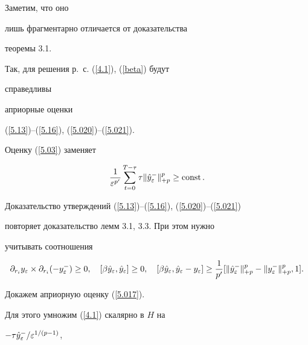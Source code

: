 \begin{pf}


Заметим, что оно 


лишь фрагментарно отличается от доказательства


теоремы 3.1.


Так, для решения р.~с. (\ref{4.1}), (\ref{beta}) будут


справедливы


априорные оценки


(\ref{5.13})--(\ref{5.16}), (\ref{5.020})--(\ref{5.021}).


Оценку (\ref{5.03}) заменяет


\begin{equation}\label{5.017}


\frac{1}{\varepsilon^{p'}}


\sum^{T-\tau}_{t=0} \tau \|


\Hat{y}_\varepsilon^{-} \|^p_{+p} \ge \const. 


\end{equation}





Доказательство утверждений (\ref{5.13})--(\ref{5.16}), (\ref{5.020})--(\ref{5.021})


повторяет доказательство лемм 3.1, 3.3. При этом нужно


учитывать соотношения


$$


\partial_{r_i} y_\varepsilon \times \partial_{r_i} (-y_\varepsilon^{-})


\ge 0,\quad






[ \beta\Hat{y}_\varepsilon,\Hat{y}_\varepsilon ] \ge 0,\quad


[ \beta\Hat{y}_\varepsilon,\Hat{y}_\varepsilon - y_\varepsilon ] \ge


\frac{1}{p'} [ \| \Hat{y}_\varepsilon^{-}


\|^p_{+p}- \| y_\varepsilon^{-}\|^p_{+p}, 1 ].


$$





Докажем априорную оценку (\ref{5.017}).


Для этого умножим (\ref{4.1}) скалярно в $H$ на


$-\tau\Hat{y}_\varepsilon^{-}/\varepsilon^{1/(p-1)}$,



\end{pf}
